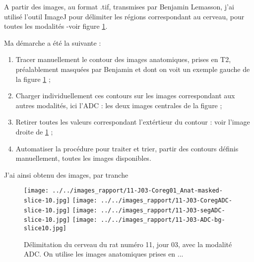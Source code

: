 %
\par
A partir des images, au format .tif, transmises par Benjamin Lemasson, %
j'ai utilis\'e l'outil ImageJ pour d\'elimiter les r\'egions correspondant au cerveau, pour toutes les modalit\'es -voir figure \ref{cephcer}.
\par
Ma d\'emarche a \'et\'e la suivante :
\begin{enumerate}
\item Tracer manuellement le contour des images anatomiques, prises en T2, pr\'ealablement masqu\'ees par Benjamin et dont on voit un exemple  gauche de la figure \ref{cephcer} ;
\item Charger individuellement ces contours sur les images correspondant aux autres modalit\'es, ici l'ADC : les deux images centrales de la figure ;
\item Retirer toutes les valeurs correspondant  l'ext\'ertieur du contour : voir l'image  droite de \ref{cephcer} ;
\item Automatiser la proc\'edure pour traiter et trier,  partir des contours d\'efinis manuellement, toutes les images disponibles.
\end{enumerate}

J'ai ainsi obtenu des images, par tranche

\begin{figure}%
\texttt{[image: ../../images\_rapport/11-J03-Coreg01\_Anat-masked-slice-10.jpg]}
\hfill
\texttt{[image: ../../images\_rapport/11-J03-CoregADC-slice-10.jpg]}
\hfill
\texttt{[image: ../../images\_rapport/11-J03-segADC-slice-10.jpg]}
\hfill
\texttt{[image: ../../images\_rapport/11-J03-ADC-bg-slice10.jpg]}
\caption{D\'elimitation du cerveau du rat num\'ero 11, jour 03, avec la modalit\'e ADC. On utilise les images anatomiques prises en ...}%
\label{cephcer}
\end{figure}





\begin{comment}
\caption{IRM multiparam\'etrique : on distingue, sur les images ADC, CBF et T1map une zone sombre dans l'\'emisph\g{e}re gauche.
\\
Ces r\'egions varient peu suivant la modalit\'e, et sont quasiment identiques pour l'ADC et en T1. La zone d'int\'er\^et du CBF, %
l\'eg\g{e}rement plus grande et qui correspond \g{a} un crit\g{e}re physiologique d'insch\'emie, sera retenue.}
\ref{lesion_R11_J00}
\end{comment}

